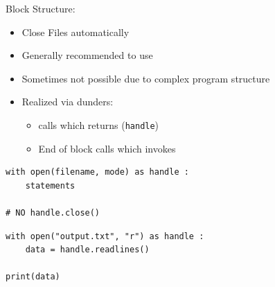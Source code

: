 \begin{frame}[fragile]{Block Structure: }
%
\begin{itemize}
\item Close Files automatically
\item Generally recommended to use
\item Sometimes not possible due to complex program structure
\item Realized via dunders:
	\begin{itemize}
	\item {} calls  which returns  (\ie \texttt{handle})
	\item End of  block calls  which invokes 
	\end{itemize}
\end{itemize}

\vspace{12pt}
\begin{tcbraster}[raster columns=2,
                  raster equal height,
                  nobeforeafter,
                  raster column skip=0.3cm]
\begin{codebox}
\begin{verbatim}
with open(filename, mode) as handle :
    statements

# NO handle.close()
\end{verbatim}
\end{codebox}
%
\begin{codebox}
\begin{verbatim}
with open("output.txt", "r") as handle :
    data = handle.readlines()
    
print(data)
\end{verbatim}
\end{codebox}
\end{tcbraster}
%
\end{frame}


